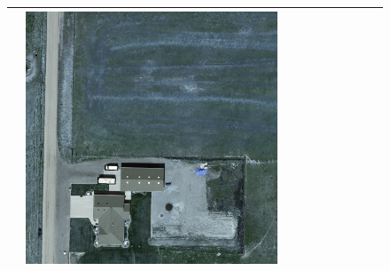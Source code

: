 \begin{figure}[H]
\begin{tabularx}{\textwidth}{c|*{9}{X}}
    & \includegraphics[trim={300pt 355pt 610pt 570pt},clip,width=\linewidth]{images/015Results/02perm_exp/comp_images/ground_truth/198.png} \\ \hline


\end{tabularx}
\end{figure}
